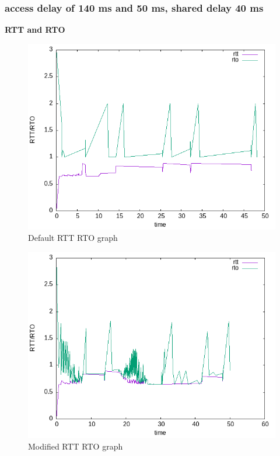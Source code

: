 \documentclass{article}[12pt]
\begin{document}
\newpage
\subsubsection{access delay of 140 ms and 50 ms, shared delay 40 ms}


\textbf{RTT and RTO }
\begin{figure}[H]
	\centering
	\includegraphics[height=0.6\textwidth]{Pictures/rtt/175/b/rtt_rto_graph.png}
	\caption{Default RTT RTO graph}
\end{figure}   

\begin{figure}[H]
	\centering
	\includegraphics[height=.6\textwidth]{Pictures/rtt/175/m/rtt_rto_graph.png}
	\caption{Modified RTT RTO graph}
\end{figure}   
\end{document}
